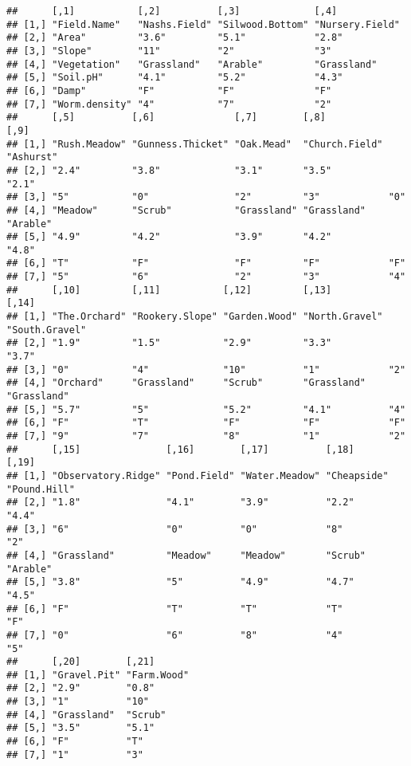 \documentclass[]{article}
\begin{document}
\begin{verbatim}
##      [,1]           [,2]          [,3]             [,4]           
## [1,] "Field.Name"   "Nashs.Field" "Silwood.Bottom" "Nursery.Field"
## [2,] "Area"         "3.6"         "5.1"            "2.8"          
## [3,] "Slope"        "11"          "2"              "3"            
## [4,] "Vegetation"   "Grassland"   "Arable"         "Grassland"    
## [5,] "Soil.pH"      "4.1"         "5.2"            "4.3"          
## [6,] "Damp"         "F"           "F"              "F"            
## [7,] "Worm.density" "4"           "7"              "2"            
##      [,5]          [,6]              [,7]        [,8]           [,9]     
## [1,] "Rush.Meadow" "Gunness.Thicket" "Oak.Mead"  "Church.Field" "Ashurst"
## [2,] "2.4"         "3.8"             "3.1"       "3.5"          "2.1"    
## [3,] "5"           "0"               "2"         "3"            "0"      
## [4,] "Meadow"      "Scrub"           "Grassland" "Grassland"    "Arable" 
## [5,] "4.9"         "4.2"             "3.9"       "4.2"          "4.8"    
## [6,] "T"           "F"               "F"         "F"            "F"      
## [7,] "5"           "6"               "2"         "3"            "4"      
##      [,10]         [,11]           [,12]         [,13]          [,14]         
## [1,] "The.Orchard" "Rookery.Slope" "Garden.Wood" "North.Gravel" "South.Gravel"
## [2,] "1.9"         "1.5"           "2.9"         "3.3"          "3.7"         
## [3,] "0"           "4"             "10"          "1"            "2"           
## [4,] "Orchard"     "Grassland"     "Scrub"       "Grassland"    "Grassland"   
## [5,] "5.7"         "5"             "5.2"         "4.1"          "4"           
## [6,] "F"           "T"             "F"           "F"            "F"           
## [7,] "9"           "7"             "8"           "1"            "2"           
##      [,15]               [,16]        [,17]          [,18]       [,19]       
## [1,] "Observatory.Ridge" "Pond.Field" "Water.Meadow" "Cheapside" "Pound.Hill"
## [2,] "1.8"               "4.1"        "3.9"          "2.2"       "4.4"       
## [3,] "6"                 "0"          "0"            "8"         "2"         
## [4,] "Grassland"         "Meadow"     "Meadow"       "Scrub"     "Arable"    
## [5,] "3.8"               "5"          "4.9"          "4.7"       "4.5"       
## [6,] "F"                 "T"          "T"            "T"         "F"         
## [7,] "0"                 "6"          "8"            "4"         "5"         
##      [,20]        [,21]      
## [1,] "Gravel.Pit" "Farm.Wood"
## [2,] "2.9"        "0.8"      
## [3,] "1"          "10"       
## [4,] "Grassland"  "Scrub"    
## [5,] "3.5"        "5.1"      
## [6,] "F"          "T"        
## [7,] "1"          "3"
\end{verbatim}
\end{document}
